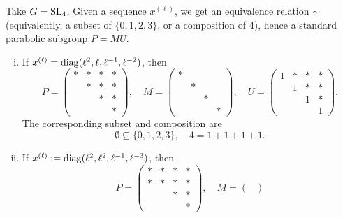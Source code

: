 \documentclass[reqno]{amsart} 
\begin{document}
\begin{example}\label{example:stoes2021:take-g-=}
  Take $G = \operatorname{SL}_4$.  Given a sequence $x^{(\ell)}$, we get an equivalence relation $\sim$ (equivalently, a subset of $\{0,1,2,3\}$, or a composition of $4$), hence a standard parabolic subgroup $P = M U$.
  \begin{enumerate}
    [(i)]
  \item If $x^{(\ell)} = \operatorname{diag}(\ell^2, \ell, \ell^{-1}, \ell^{-2})$, then
    \begin{equation*}
      P = 
      \begin{pmatrix}
        \ast & \ast & \ast & \ast \\
             & \ast & \ast & \ast \\
             &  & \ast & \ast \\
             & & & \ast
      \end{pmatrix}
      , \quad M =
      \begin{pmatrix}
        \ast &  &  &  \\
             & \ast &  &  \\
             &  & \ast &  \\
             & & & \ast
      \end{pmatrix}
      , \quad U = 
      \begin{pmatrix}
        1 & \ast & \ast & \ast \\
          & 1 & \ast & \ast \\
          &  & 1 & \ast \\
          & & & 1
      \end{pmatrix}
      .
    \end{equation*}
    The corresponding subset and composition are
    \begin{equation*}
      \emptyset \subseteq \{0,1,2,3\},
      \quad
      4 = 1 + 1 + 1 +1.
    \end{equation*}
  \item If $x^{(\ell)} := \operatorname{diag}(\ell^2, \ell^2, \ell^{-1}, \ell^{-3})$, then
    \begin{equation*}
      P = 
      \begin{pmatrix}
        \ast & \ast & \ast & \ast \\
        \ast & \ast & \ast & \ast \\
             &  & \ast & \ast \\
             & &  & \ast
      \end{pmatrix}
      , \quad M = 
      \begin{pmatrix}

\end{pmatrix}
\end{equation*}
\end{enumerate}
\end{example}
\end{document}
